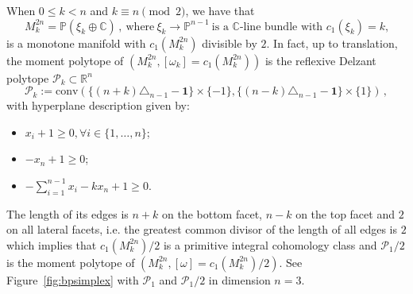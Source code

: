 \documentclass[a4paper,11pt,reqno]{amsart}
\newcommand{\R}{\mathbb R}
\newcommand{\C}{\mathbb C}
\newcommand{\CP}{\mathbb P}
\newcommand{\Pp}{{\mathcal P}}
\begin{document}
When $0\leq k < n$ and $ k\equiv n \pmod 2$, we have that 
\[
M^{2n}_k = \CP (\xi_k \oplus \C)\,, \ \text{where}\ \xi_k \to \CP^{n-1} \ \text{is a $\C$-line bundle
with $c_1 (\xi_k) = k$,}
\]
is a monotone manifold with $c_1(M_k^{2n})$ divisible by $2$. In fact, up to translation, the moment
polytope of $(M^{2n}_k, [\omega_k] = c_1(M_k^{2n}))$ is the reflexive Delzant polytope $\Pp_k \subset \R^n$
\[
\mathcal{P}_k := \text{conv}\left( \{(n+k)\triangle_{n-1} - \bm{1}\} \times \{-1\}, \{(n-k)\triangle_{n-1} - \bm{1}\}  \times \{1\} \right)\,,
\]
with hyperplane description given by:
\begin{itemize}
\item $x_i +1 \geq 0, \forall i \in \{1, \dots, n \}$;
\item $- x_n + 1 \geq 0$;
\item $-\sum_{i=1}^{n-1} x_i- k x_n  +1 \geq 0$.
\end{itemize}
The length of its edges is $n+k$ on the bottom facet, $n-k$ on the top facet and $2$ on all lateral facets, i.e. the greatest
common divisor of the length of all edges is $2$ which implies that $c_1(M_k^{2n})/2$ is a primitive integral cohomology class
and $\Pp_1 / 2$ is the moment polytope of $(M^{2n}_k, [\omega] = c_1(M_k^{2n})/2)$.
See Figure~\ref{fig:bpsimplex} with $\Pp_1$ and $\Pp_1 / 2$ in dimension $n=3$.
\end{document}
